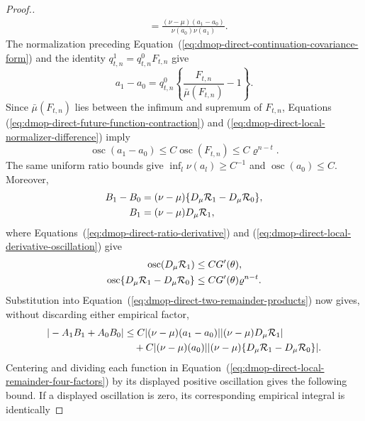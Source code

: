 \documentclass[11pt]{article}
\theoremstyle{thmstylethree}%
\begin{document}
\begin{proof}[Proof.]
\begin{align}
&=
\frac{(\nu-\mu)(a_1-a_0)}{\nu(a_0)\nu(a_1)}.
\label{eq:dmop-direct-local-A-difference}
\end{align}
The normalization preceding
Equation~(\ref{eq:dmop-direct-continuation-covariance-form}) and the
identity $q_{t,n}^{1}=q_{t,n}^{0}F_{t,n}$ give
\begin{equation}
a_1-a_0
=
q_{t,n}^{0}
\left\{
\frac{F_{t,n}}{\bar\mu(F_{t,n})}-1
\right\}.
\label{eq:dmop-direct-local-normalizer-difference}
\end{equation}
Since $\bar\mu(F_{t,n})$ lies between the infimum and supremum of
$F_{t,n}$, Equations~
(\ref{eq:dmop-direct-future-function-contraction}) and
(\ref{eq:dmop-direct-local-normalizer-difference}) imply
\begin{equation}
\operatorname{osc}(a_1-a_0)
\leq C\operatorname{osc}(F_{t,n})
\leq C\varrho^{n-t}.
\label{eq:dmop-direct-local-normalizer-difference-bound}
\end{equation}
The same uniform ratio bounds give
$\inf_l\nu(a_l)\geq C^{-1}$ and
$\operatorname{osc}(a_0)\leq C$.  Moreover,
\begin{align}
B_1-B_0
&=(\nu-\mu)
\{D_\mu\mathcal R_1-D_\mu\mathcal R_0\},                 \notag\\
B_1
&=(\nu-\mu)D_\mu\mathcal R_1,
\end{align}
where Equations~(\ref{eq:dmop-direct-ratio-derivative}) and
(\ref{eq:dmop-direct-local-derivative-oscillation}) give
\begin{align}
\operatorname{osc}(D_\mu\mathcal R_1)
&\leq CG'(\theta),                                        \notag\\
\operatorname{osc}
\{D_\mu\mathcal R_1-D_\mu\mathcal R_0\}
&\leq CG'(\theta)\varrho^{n-t}.
\label{eq:dmop-direct-local-B-factor-bounds}
\end{align}
Substitution into
Equation~(\ref{eq:dmop-direct-two-remainder-products}) now gives, without
discarding either empirical factor,
\begin{align}
|-A_1B_1+A_0B_0|
&\leq
C|(\nu-\mu)(a_1-a_0)|
|(\nu-\mu)D_\mu\mathcal R_1|                              \notag\\
&\quad+
C|(\nu-\mu)(a_0)|
|(\nu-\mu)
\{D_\mu\mathcal R_1-D_\mu\mathcal R_0\}|.
\label{eq:dmop-direct-local-remainder-four-factors}
\end{align}
Centering and dividing each function in
Equation~(\ref{eq:dmop-direct-local-remainder-four-factors}) by its
displayed positive oscillation gives the following bound.  If a displayed
oscillation is zero, its corresponding empirical integral is identically

\end{proof}
\end{document}
